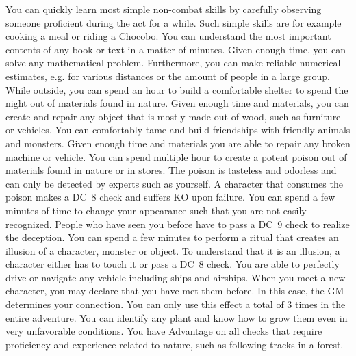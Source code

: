 \vfill
{}
{
	You can quickly learn most simple non-combat skills by carefully observing someone proficient during the act for a while. 
	Such simple skills are for example cooking a meal or riding a Chocobo.
}
\newpage
{}
{
	You can understand the most important contents of any book or text in a matter of minutes.
}
\vfill
{}
{
	Given enough time, you can solve any mathematical problem.
	Furthermore, you can make reliable numerical estimates, e.g. for various distances or the amount of people in a large group.
}
\vfill
{}
{
	While outside, you can spend an hour to build a comfortable shelter to spend the night out of materials found in nature.
}	
\vfill
{}
{
	Given enough time and materials, you can create and repair any object that is mostly made out of wood, such as furniture or vehicles.
}
\vfill
{}
{
	You can comfortably tame and build friendships with friendly animals and monsters.
}
\vfill
{}
{
	Given enough time and materials you are able to repair any broken machine or vehicle. 
}
\vfill
{}
{
	You can spend multiple hour to create a potent poison out of materials found in nature or in stores.
	The poison is tasteless and odorless and can only be detected by experts such as yourself.
	A character that consumes the poison makes a DC~8 check and suffers KO upon failure.
}
\vfill
{}
{
	You can spend a few minutes of time to change your appearance such that you are not easily recognized.
	People who have seen you before have to pass a DC~9 check to realize the deception.
}
\vfill
{}
{
	You can spend a few minutes to perform a ritual that creates an illusion of a character, monster or object.
	To understand that it is an illusion, a character either has to touch it or pass a DC~8 check.
}
\vfill
{}
{
	You are able to perfectly drive or navigate any vehicle including ships and airships. 
}
\vfill
{}
{
	When you meet a new character, you may declare that you have met them before.
	In this case, the GM determines your connection.	
	You can only use this effect a total of 3 times in the entire adventure.
}
\vfill
{} 
{
	You can identify any plant and know how to grow them even in very unfavorable conditions.
}
\vfill
{}
{
	You have Advantage on all checks that require proficiency and experience related to nature, such as following tracks in a forest. 
}
%
\newpage
%
